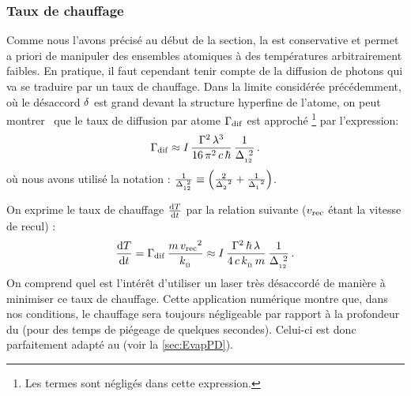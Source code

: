 \subsubsection{Taux de chauffage}
Comme nous l'avons précisé au début de la section, la \fd est conservative et permet a priori de manipuler des ensembles atomiques à des températures arbitrairement faibles. En pratique, il faut cependant tenir compte de la diffusion de photons qui va se traduire par un taux de chauffage. Dans la limite considérée précédemment, où le désaccord ${\delta}$ est grand devant la structure hyperfine de l'atome, on peut montrer~\cite{GWO99} que le taux de diffusion par atome ${\Gamma_{\rm dif}}$ est approché%
\footnote{Les termes  sont négligés dans cette expression. }
 par l'expression:
\begin{equation}
	\Gammadif 
	\approx I \, \frac{\pulsSpont^2\,{\LO}^3}{16\,\pi^2\,c\,\hbar}
	\, \frac{1}{\deseffcarre}
	\pointformule
	\label{eq:TauxAbsorption}
\end{equation}
où nous avons utilisé la notation : $\frac{1}{\deseffcarre} \equiv \left(\frac{2}{{\desacD}^2} + \frac{1}{{\desacU}^2} \right)$.

\noindent On exprime le taux de chauffage ${{\frac{\mathrm{d} T}{\mathrm{d} t}}}$ par la relation suivante (${v_{\rm rec}}$ étant la vitesse de recul) :
\begin{equation}
	\dT 
	= \Gammadif \, \frac{m\,\vrecul^2}{\kb} 
	\approx
	I \, \frac{\pulsSpont^2\,\hbar\,\LO}{4\,c\,\kb\,m}
	\, \frac{1}{\deseffcarre}
	\pointformule
	\label{eq:TauxChauffage}
\end{equation}
On comprend quel est l'intérêt d'utiliser un laser très désaccordé de manière à minimiser ce taux de chauffage.
Cette application numérique montre que, dans nos conditions, le chauffage sera toujours négligeable par rapport à la profondeur du \pd (pour des temps de piégeage de quelques secondes). Celui-ci est donc parfaitement adapté au \rpef (voir la \autoref{sec:EvapPD}).


